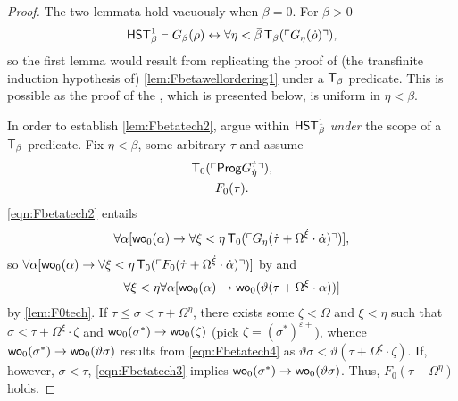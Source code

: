 \documentclass[UKenglish,cleveref,DIV=12]{scrartcl}
\theoremstyle{definition}
\theoremstyle{definition}
\begin{document}
\begin{proof}
The two lemmata hold vacuously when $\beta=0$. For $\beta>0$
\begin{align*}
 \mathsf{HST}_\beta^1\vdash G_\beta(\rho)\leftrightarrow \forall\eta<\bar\beta\,\mathsf{T}_\beta(\ulcorner{G_\eta(\dot\rho)}\urcorner),
\end{align*}
so the first lemma would result from replicating the proof of (the transfinite
induction hypothesis of) \cref{lem:Fbetawellordering1} under a $\mathsf{T}_\beta$
predicate. This is possible as the proof of the , which is presented below, is
uniform in $\eta<\beta$.

In order to establish \cref{lem:Fbetatech2}, argue within $\mathsf{HST}_\beta^1$ \emph{under} the scope of a $\mathsf{T}_\beta$ predicate. Fix $\eta<\bar\beta$, some arbitrary $\tau$ and assume
\begin{gather}
  \mathsf{T}_0(\ulcorner{\mathsf{Prog}G_{\dot \eta}^{\dot\tau}}\urcorner),\label{eqn:Fbetatech2}\\
  F_0(\tau).\label{eqn:Fbetatech3}
\end{gather}
\eqref{eqn:Fbetatech2} entails
\begin{gather*}
  \forall\alpha [\mathsf{wo}_0(\alpha)\rightarrow \forall\xi<\eta\,\mathsf{T}_0(\ulcorner{G_\eta(\dot\tau+\Omega^{\dot\xi}\cdot\dot\alpha)}\urcorner)],
\end{gather*}
so $\forall\alpha[\mathsf{wo}_0(\alpha)\rightarrow \forall\xi<\eta\,\mathsf{T}_0(\ulcorner{F_0(\dot\tau+\Omega^{\dot\xi}\cdot\dot\alpha)}\urcorner)]$ by  and
\begin{align}\label{eqn:Fbetatech4}
  \forall\xi<\eta\forall\alpha [\mathsf{wo}_0(\alpha)\rightarrow\mathsf{wo}_0(\vartheta(\tau+\Omega^\xi\cdot\alpha))]
\end{align}
by \cref{lem:F0tech}. If $\tau\le\sigma<\tau+\Omega^\eta$, there exists some
$\zeta<\Omega$ and $\xi<\eta$ such that $\sigma<\tau+\Omega^\xi\cdot\zeta$
and $\mathsf{wo}_0(\sigma^*)\rightarrow \mathsf{wo}_0(\zeta)$ (pick
$\zeta=(\sigma^*)^{\varepsilon+}$), whence $\mathsf{wo}_0(\sigma^*)\rightarrow
\mathsf{wo}_0(\vartheta\sigma)$ results from \eqref{eqn:Fbetatech4} as
$\vartheta\sigma<\vartheta(\tau+\Omega^\xi\cdot\zeta)$. If, however,
$\sigma<\tau$, \eqref{eqn:Fbetatech3} implies $\mathsf{wo}_0(\sigma^*)\rightarrow
\mathsf{wo}_0(\vartheta\sigma)$. Thus, $F_0(\tau+\Omega^\eta)$ holds.
\end{proof}
\end{document}
